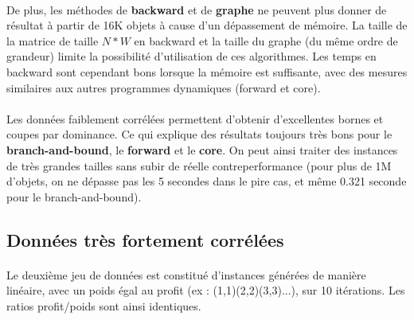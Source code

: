 \documentclass[12pt]{article}
\begin{document}
\paragraph{}De plus, les méthodes de \textbf{backward} et de \textbf{graphe} ne peuvent plus donner de résultat à partir de 16K objets à cause d'un dépassement de mémoire. La taille de la matrice de taille $N*W$ en backward et la taille du graphe (du même ordre de grandeur) limite la possibilité d'utilisation de ces algorithmes. Les temps en backward sont cependant bons lorsque la mémoire est suffisante, avec des mesures similaires aux autres programmes dynamiques (forward et core).

\paragraph{}Les données faiblement corrélées permettent d'obtenir d'excellentes bornes et coupes par dominance. Ce qui explique des résultats toujours très bons pour le \textbf{branch-and-bound}, le \textbf{forward} et le \textbf{core}. On peut ainsi traiter des instances de très grandes tailles sans subir de réelle contreperformance (pour plus de 1M d'objets, on ne dépasse pas les 5 secondes dans le pire cas, et même 0.321 seconde pour le branch-and-bound).


\subsection{Données très fortement corrélées}

\paragraph{}Le deuxième jeu de données est constitué d'instances générées de manière linéaire, avec un poids égal au profit (ex : (1,1)(2,2)(3,3)...), sur 10 itérations. Les ratios profit/poids sont ainsi identiques.
\end{document}
